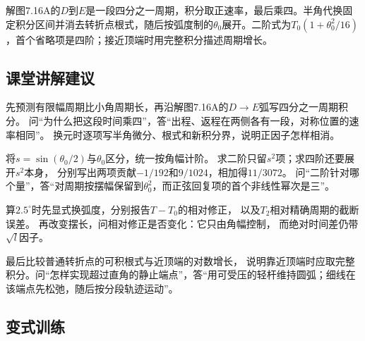 \documentclass[UTF8,fontset=fandol,a4paper,11pt]{ctexart}
\begin{document}
解图7.16A的$D$到$E$是一段四分之一周期，积分取正速率，最后乘四。半角代换固定积分区间并消去转折点根式，随后按弧度制的$\theta_0$展开。二阶式为$T_0(1+\theta_0^2/16)$，首个省略项是四阶；接近顶端时用完整积分描述周期增长。




\subsection*{课堂讲解建议}

先预测有限幅周期比小角周期长，再沿解图7.16A的$D\to E$弧写四分之一周期积分。
问“为什么把这段时间乘四”，答“出程、返程在两侧各有一段，对称位置的速率相同”。
换元时逐项写半角微分、根式和新积分界，说明正因子怎样相消。

将$s=\sin(\theta_0/2)$与$\theta_0$区分，统一按角幅计阶。
求二阶只留$s^2$项；求四阶还要展开$s^2$本身，
分别写出两项贡献$-1/192$和$9/1024$，相加得$11/3072$。
问“二阶针对哪个量”，答“对周期按摆幅保留到$\theta_0^2$，而正弦回复项的首个非线性幂次是三”。

算$2.5^\circ$时先显式换弧度，分别报告$T-T_0$的相对修正，
以及$T_2$相对精确周期的截断误差。
再改变摆长，问相对修正是否变化：它只由角幅控制，
而绝对时间差仍带$\sqrt l$因子。

最后比较普通转折点的可积根式与近顶端的对数增长，
说明靠近顶端时应取完整积分。问“怎样实现超过直角的静止端点”，答“用可受压的轻杆维持圆弧；细线在该端点先松弛，随后按分段轨迹运动”。




\subsection*{变式训练}
\end{document}
